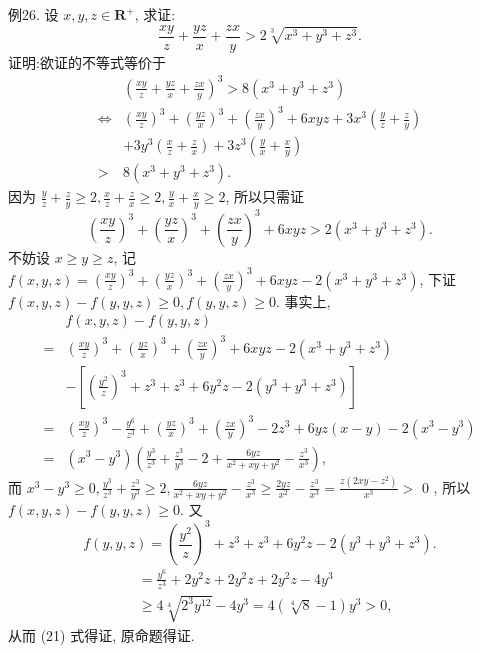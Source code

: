 例26. 设 $x, y, z \in \mathbf{R}^{+}$, 求证:
$$
\frac{x y}{z}+\frac{y z}{x}+\frac{z x}{y}>2 \sqrt[3]{x^3+y^3+z^3} .
$$
证明:欲证的不等式等价于
$$
\begin{aligned}
& \left(\frac{x y}{z}+\frac{y z}{x}+\frac{z x}{y}\right)^3>8\left(x^3+y^3+z^3\right) \\
\Leftrightarrow & \left(\frac{x y}{z}\right)^3+\left(\frac{y z}{x}\right)^3+\left(\frac{z x}{y}\right)^3+6 x y z+3 x^3\left(\frac{y}{z}+\frac{z}{y}\right) \\
& +3 y^3\left(\frac{x}{z}+\frac{z}{x}\right)+3 z^3\left(\frac{y}{x}+\frac{x}{y}\right) \\
> & 8\left(x^3+y^3+z^3\right) .
\end{aligned}
$$
因为 $\frac{y}{z}+\frac{z}{y} \geqslant 2, \frac{x}{z}+\frac{z}{x} \geqslant 2, \frac{y}{x}+\frac{x}{y} \geqslant 2$, 所以只需证
$$
\left(\frac{x y}{z}\right)^3+\left(\frac{y z}{x}\right)^3+\left(\frac{z x}{y}\right)^3+6 x y z>2\left(x^3+y^3+z^3\right) .
$$
不妨设 $x \geqslant y \geqslant z$, 记 $f(x, y, z)=\left(\frac{x y}{z}\right)^3+\left(\frac{y z}{x}\right)^3+\left(\frac{z x}{y}\right)^3+6 x y z- 2\left(x^3+y^3+z^3\right)$, 下证 $f(x, y, z)-f(y, y, z) \geqslant 0, f(y, y, z) \geqslant 0$.
事实上,
$$
\begin{aligned}
& f(x, y, z)-f(y, y, z) \\
= & \left(\frac{x y}{z}\right)^3+\left(\frac{y z}{x}\right)^3+\left(\frac{z x}{y}\right)^3+6 x y z-2\left(x^3+y^3+z^3\right) \\
& -\left[\left(\frac{y^2}{z}\right)^3+z^3+z^3+6 y^2 z-2\left(y^3+y^3+z^3\right)\right] \\
= & \left(\frac{x y}{z}\right)^3-\frac{y^6}{z^3}+\left(\frac{y z}{x}\right)^3+\left(\frac{z x}{y}\right)^3-2 z^3+6 y z(x-y)-2\left(x^3-y^3\right) \\
= & \left(x^3-y^3\right)\left(\frac{y^3}{z^3}+\frac{z^3}{y^3}-2+\frac{6 y z}{x^2+x y+y^2}-\frac{z^3}{x^3}\right),
\end{aligned}
$$
而 $x^3-y^3 \geqslant 0, \frac{y^3}{z^3}+\frac{z^3}{y^3} \geqslant 2, \frac{6 y z}{x^2+x y+y^2}-\frac{z^3}{x^3} \geqslant \frac{2 y z}{x^2}-\frac{z^3}{x^3}=\frac{z\left(2 x y-z^2\right)}{x^3}>$ 0 , 所以 $f(x, y, z)-f(y, y, z) \geqslant 0$.
又
$$
f(y, y, z)=\left(\frac{y^2}{z}\right)^3+z^3+z^3+6 y^2 z-2\left(y^3+y^3+z^3\right) . \label{(21)}
$$
$$
\begin{aligned}
& =\frac{y^6}{z^3}+2 y^2 z+2 y^2 z+2 y^2 z-4 y^3 \\
& \geqslant 4 \sqrt[4]{2^3 y^{12}}-4 y^3=4(\sqrt[4]{8}-1) y^3>0,
\end{aligned}
$$
从而 (21) 式得证, 原命题得证.



